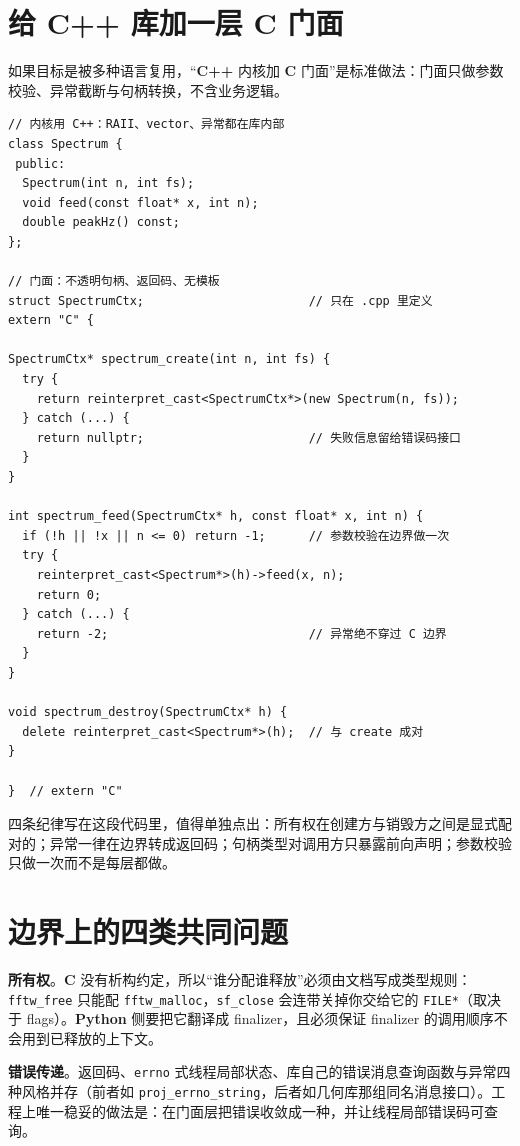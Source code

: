 \documentclass[12pt,a4paper,fontset=fandol]{ctexbook}
\newcommand{\Tp}[1]{\texttt{#1}}
\newcommand{\Lang}[1]{\textsf{\bfseries #1}}
\newcommand{\CL}{\Lang{C}}
\newcommand{\CPP}{\Lang{C++}}
\newcommand{\PY}{\Lang{Python}}
\begin{document}
\section{给 \CPP{} 库加一层 C 门面}

如果目标是被多种语言复用，``\CPP{} 内核加 \CL{} 门面''是标准做法：门面只做参数校验、异常截断与句柄转换，不含业务逻辑。

\begin{lstlisting}[style=cppstyle,caption={把 \CPP{} 内核包成句柄式 C 接口：异常在边界内消化},label={lst:ch02-handle}]
// 内核用 C++：RAII、vector、异常都在库内部
class Spectrum {
 public:
  Spectrum(int n, int fs);
  void feed(const float* x, int n);
  double peakHz() const;
};

// 门面：不透明句柄、返回码、无模板
struct SpectrumCtx;                       // 只在 .cpp 里定义
extern "C" {

SpectrumCtx* spectrum_create(int n, int fs) {
  try {
    return reinterpret_cast<SpectrumCtx*>(new Spectrum(n, fs));
  } catch (...) {
    return nullptr;                       // 失败信息留给错误码接口
  }
}

int spectrum_feed(SpectrumCtx* h, const float* x, int n) {
  if (!h || !x || n <= 0) return -1;      // 参数校验在边界做一次
  try {
    reinterpret_cast<Spectrum*>(h)->feed(x, n);
    return 0;
  } catch (...) {
    return -2;                            // 异常绝不穿过 C 边界
  }
}

void spectrum_destroy(SpectrumCtx* h) {
  delete reinterpret_cast<Spectrum*>(h);  // 与 create 成对
}

}  // extern "C"
\end{lstlisting}

四条纪律写在这段代码里，值得单独点出：所有权在创建方与销毁方之间是显式配对的；异常一律在边界转成返回码；句柄类型对调用方只暴露前向声明；参数校验只做一次而不是每层都做。

\section{边界上的四类共同问题}

\textbf{所有权}。\CL{} 没有析构约定，所以``谁分配谁释放''必须由文档写成类型规则：\Tp{fftw\_free} 只能配 \Tp{fftw\_malloc}，\Tp{sf\_close} 会连带关掉你交给它的 \Tp{FILE*}（取决于 flags）。\PY{} 侧要把它翻译成 finalizer，且必须保证 finalizer 的调用顺序不会用到已释放的上下文。

\textbf{错误传递}。返回码、\Tp{errno} 式线程局部状态、库自己的错误消息查询函数与异常四种风格并存（前者如 \Tp{proj\_errno\_string}，后者如几何库那组同名消息接口）。工程上唯一稳妥的做法是：在门面层把错误收敛成一种，并让线程局部错误码可查询。
\end{document}

